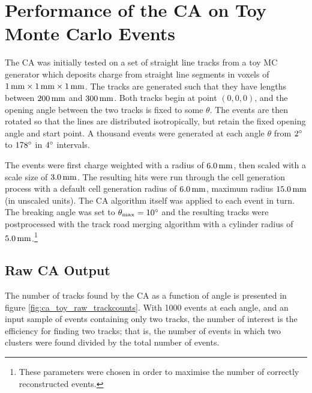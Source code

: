 \section{Performance of the \acl{CA} on Toy Monte Carlo Events}\label{sec:ca-toy-tracks}
The \ac{CA} was initially tested on a set of straight line tracks from a toy \ac{MC} generator which deposits charge from straight line segments in voxels of $1\,\mathrm{mm}\times1\,\mathrm{mm}\times1\,\mathrm{mm}$. The tracks are generated such that they have lengths between $200\,\mathrm{mm}$ and $300\,\mathrm{mm}$. Both tracks begin at point $(0, 0, 0)$, and the opening angle between the two tracks is fixed to some $\theta$. The events are then rotated so that the lines are distributed isotropically, but retain the fixed opening angle and start point. A thousand events were generated at each angle $\theta$ from $2^\circ$ to $178^\circ$ in $4^\circ$ intervals.

The events were first charge weighted with a radius of $6.0\,\mathrm{mm}$, then scaled with a scale size of $3.0\,\mathrm{mm}$. The resulting hits were run through the cell generation process with a default cell generation radius of $6.0\,\mathrm{mm}$, maximum radius $15.0\,\mathrm{mm}$ (in unscaled units). The \ac{CA} algorithm itself was applied to each event in turn. The breaking angle was set to $\theta_\mathrm{max} = 10^\circ$ and the resulting tracks were postprocessed with the track road merging algorithm with a cylinder radius of $5.0\,\mathrm{mm}$.\footnote{These parameters were chosen in order to maximise the number of correctly reconstructed events.}

\subsection{Raw \acl{CA} Output}
The number of tracks found by the \ac{CA} as a function of angle is presented in figure \ref{fig:ca_toy_raw_trackcounts}. With 1000 events at each angle, and an input sample of events containing only two tracks, the number of interest is the efficiency for finding two tracks; that is, the number of events in which two clusters were found divided by the total number of events.%


